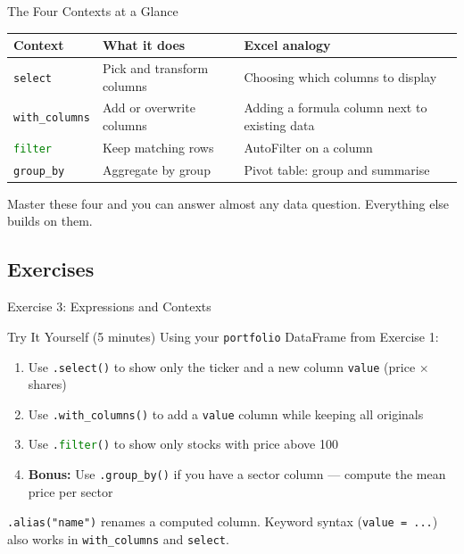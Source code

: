 \documentclass[9pt,aspectratio=169]{beamer}
\newcommand{\py}[1]{\lstinline[language=Python]{#1}}
\begin{document}
\begin{frame}{The Four Contexts at a Glance}

\begin{tabular}{@{}lp{4cm}p{5.5cm}@{}}
\toprule
\textbf{Context} & \textbf{What it does} & \textbf{Excel analogy} \\
\midrule
\py{select} & Pick and transform columns & Choosing which columns to display \\[0.5em]
\py{with_columns} & Add or overwrite columns & Adding a formula column next to existing data \\[0.5em]
\py{filter} & Keep matching rows & AutoFilter on a column \\[0.5em]
\py{group_by} & Aggregate by group & Pivot table: group and summarise \\
\bottomrule
\end{tabular}

\bigskip

\begin{highlightbox}
\centering
Master these four and you can answer almost any data question. Everything else builds on them.
\end{highlightbox}

\end{frame}


\subsection{Exercises}
\begin{frame}[fragile]{Exercise 3: Expressions and Contexts}

\begin{alertblock}{Try It Yourself (5 minutes)}
Using your \texttt{portfolio} DataFrame from Exercise 1:
\begin{enumerate}
    \item Use \py{.select()} to show only the ticker and a new column \texttt{value} (price $\times$ shares)
    \item Use \py{.with_columns()} to add a \texttt{value} column while keeping all originals
    \item Use \py{.filter()} to show only stocks with price above 100
    \item \textbf{Bonus:} Use \py{.group_by()} if you have a sector column --- compute the mean price per sector
\end{enumerate}
\end{alertblock}

\medskip

\begin{highlightbox}
\centering
\texttt{.alias("name")} renames a computed column. Keyword syntax (\texttt{value = ...}) also works in \texttt{with\_columns} and \texttt{select}.
\end{highlightbox}

\end{frame}
\end{document}
